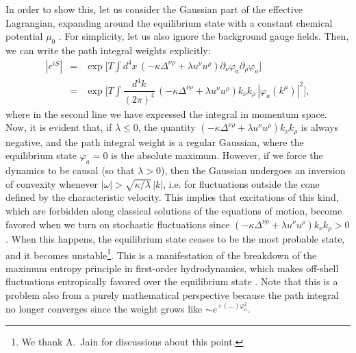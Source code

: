 \documentclass[aps,prd,nofootinbib,amsmath,amssymb,showpacs,longbibliography,singlecolumn,superscriptaddress,notitlepage]{revtex4-1}
\theoremstyle{plain}
\theoremstyle{definition}
\begin{document}
In order to show this, let us consider the Gaussian part of the effective Lagrangian, expanding around the equilibrium state with a constant chemical potential $\mu_0$ \cite{Jain:2020vgc}. For simplicity, let us also ignore the background gauge fields. Then, we can write the path integral weights explicitly:
\begin{eqnarray}
    |e^{iS}|&=&\exp\bigg[ T \int d^4 x \,  (-\kappa \Delta^{\nu\rho}+\lambda u^\nu u^\rho)\partial_\nu \varphi_a \partial_\rho \varphi_a \bigg] \\
    &=& \exp\bigg[ T \int \dfrac{d^4 k}{(2\pi)^4} \,  (-\kappa \Delta^{\nu\rho}+\lambda u^\nu u^\rho)k_\nu k_\rho  \, |\varphi_a(k^\mu)|^2 \bigg] ,
\end{eqnarray}
where in the second line we have expressed the integral in momentum space. Now, it is evident that, if $\lambda \leq 0$, the quantity $(-\kappa \Delta^{\nu\rho}+\lambda u^\nu u^\rho)k_\nu k_\rho$ is always negative, and the path integral weight is a regular Gaussian, where the equilibrium state $\varphi_a=0$ is the absolute maximum. However, if we force the dynamics to be causal (so that $\lambda >0$), then the Gaussian undergoes an inversion of convexity whenever $|\omega|>\sqrt{\kappa/\lambda}\, |k|$, i.e. for fluctuations outside the cone defined by the characteristic velocity. This implies that excitations of this kind, which are forbidden along classical solutions of the equations of motion, become favored when we turn on stochastic fluctuations since $(-\kappa \Delta^{\nu\rho}+\lambda u^\nu u^\rho)k_\nu k_\rho>0$. When this happens,  the equilibrium state ceases to be the most probable state, and it becomes unstable\footnote{We thank A.~Jain for discussions about this point.}. This is a manifestation of the breakdown of the maximum entropy principle in first-order hydrodynamics, which makes off-shell fluctuations entropically favored over the equilibrium state \cite{Gavassino:2020ubn}. Note that this is a problem also from a purely mathematical perspective because the path integral no longer converges since the weight grows like $\sim e^{+(...)\varphi_a^2}$.
\end{document}

